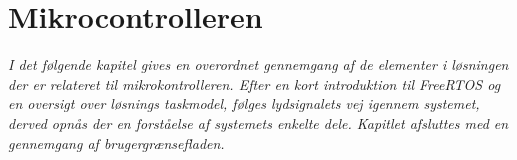 \chapter{Mikrocontrolleren}\label{kap:mcu}
\vspace*{0.5 cm}
\emph{I det følgende kapitel gives en overordnet gennemgang af de elementer i løsningen der er relateret til mikrokontrolleren. Efter en kort introduktion til FreeRTOS og en oversigt over løsnings taskmodel, følges lydsignalets vej igennem systemet, derved opnås der en forståelse af systemets enkelte dele. Kapitlet afsluttes med en gennemgang af brugergrænsefladen.}